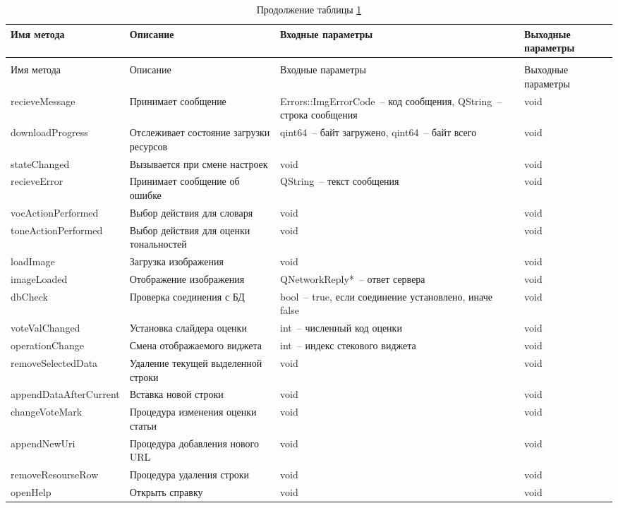 \documentclass[a4paper,14pt,russian]{extreport}
\begin{document}
\begin{longtable}{|m{3 cm}|m{3 cm}|m{4 cm}|m{4 cm}|}
\caption{Слоты класса MainWindow\label{tab:mainwindowsl}} \\
\hline 
Имя метода & Описание & Входные параметры & Выходные параметры \\
\hline
\endfirsthead
\caption*{Продолжение таблицы \ref{tab:mainwindowsl}} \\
\hline
Имя метода & Описание & Входные параметры & Выходные параметры \\
\endhead
{recieve\-Message} & Принимает сообщение & {Errors::Img\-Error\-Code}~-- код сообщения, QString~-- строка сообщения & void \\
\hline
{download\-Progress} & Отслеживает состояние загрузки ресурсов & qint64~-- байт загружено, qint64~-- байт всего & void \\
\hline
{state\-Changed} & Вызывается при смене настроек & void & void \\
\hline
{recieve\-Error} & Принимает сообщение об ошибке & QString~-- текст сообщения & void \\
\hline
{voc\-Action\-Performed} & Выбор действия для словаря & void & void \\
\hline
{tone\-Action\-Performed} & Выбор действия для оценки тональностей & void & void \\
\hline
{load\-Image} & Загрузка изображения & void & void \\
\hline
{image\-Loaded} & Отображение изображения & {QNetwork\-Reply*}~-- ответ сервера & void \\
\hline
dbCheck & Проверка соединения с БД & bool~-- true, если соединение установлено, иначе false & void \\
\hline
{vote\-Val\-Changed} & Установка слайдера оценки & int~-- численный код оценки & void \\
\hline
{operation\-Change} & Смена отображаемого виджета & int~-- индекс стекового виджета & void \\
\hline
{remove\-Selected\-Data} & Удаление текущей выделенной строки & void & void \\
\hline
{append\-Data\-After\-Current} & Вставка новой строки & void & void \\
\hline
{change\-Vote\-Mark} & Процедура изменения оценки статьи & void & void \\
\hline
{append\-New\-Uri} & Процедура добавления нового URL & void & void \\
\hline
{remove\-Resourse\-Row} & Процедура удаления строки & void & void \\
\hline
{open\-Help} & Открыть справку & void & void \\
\hline
\end{longtable}
\end{document}
